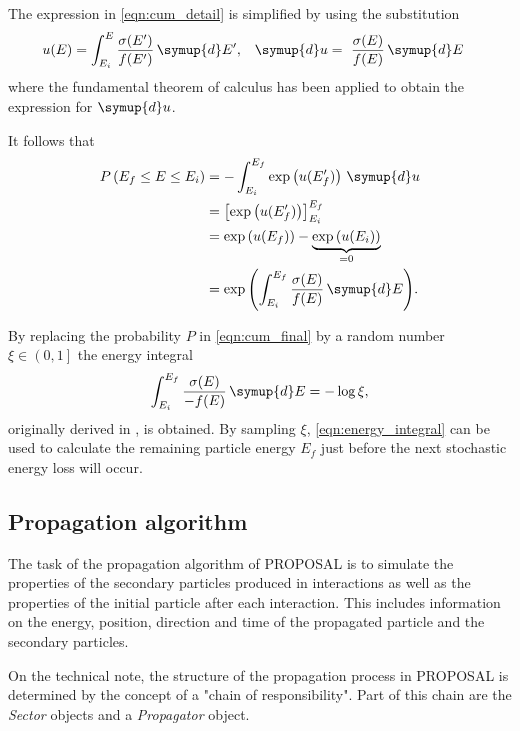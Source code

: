 The expression in \eqref{eqn:cum_detail} is simplified by using the substitution
%
\begin{align}
	u(E) &= \int_{E_i}^{E} \frac{\sigma(E')}{f(E')} \, \symup{d}E', & \symup{d}u &= \frac{\sigma(E)}{f(E)} \, \symup{d}E
\end{align}
%
where the fundamental theorem of calculus has been applied to obtain the expression for $\symup{d}u$.

It follows that
%
\begin{equation}
	\label{eqn:cum_final}
	\begin{split}
	P\left(E_f \leq E \leq E_i\right) &= - \int_{E_i}^{E_f} \exp \left( u(E_f') \right) \, \symup{d}u \\
	&= \left[ \exp \left( u(E'_f) \right) \right]_{E_i}^{E_f}\\
	&= \exp\left( u(E_f) \right) - \underbrace{\exp \left( u(E_i) \right)}_{= 0} \\
	&= \exp{\left( \int_{E_i}^{E_f} \frac{\sigma(E)}{f(E)} \, \symup{d}E \right)}.
	\end{split}
\end{equation}

By replacing the probability $P$ in \eqref{eqn:cum_final} by a random number $\xi \in \left(0, 1\right]$ the energy integral
%
\begin{equation}
	\label{eqn:energy_integral}
	\int_{E_i}^{E_f} \frac{\sigma(E)}{-f(E)} \, \symup{d}E = - \log{\xi},
\end{equation}
%
originally derived in \cite{chirkin2004propagating}, is obtained. 
By sampling $\xi$, \eqref{eqn:energy_integral} can be used to calculate the remaining particle energy $E_f$ just before the next stochastic energy loss will occur.

\subsection{Propagation algorithm}
\label{sec:algorithm}

The task of the propagation algorithm of PROPOSAL is to simulate the properties of the secondary particles produced in interactions as well as the properties of the initial particle after each interaction.
This includes information on the energy, position, direction and time of the propagated particle and the secondary particles.

On the technical note, the structure of the propagation process in PROPOSAL is determined by the concept of a "chain of responsibility".
Part of this chain are the \emph{Sector} objects and a \emph{Propagator} object.

